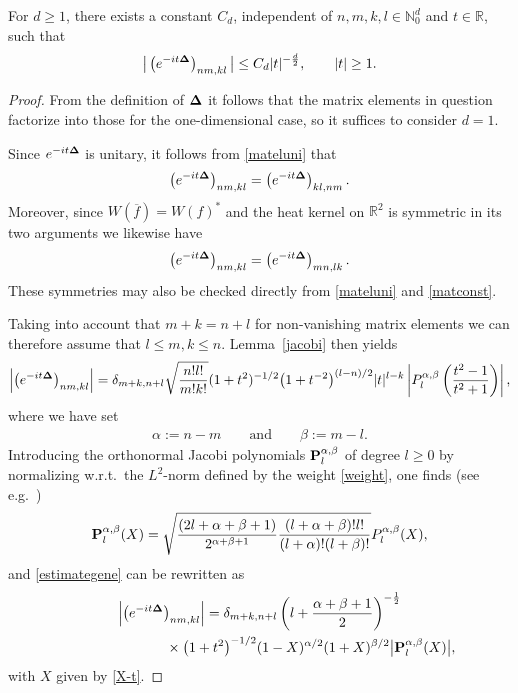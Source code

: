 \documentclass[pdftex]{sigma}
\begin{document}
\begin{lemma}
\label{Uniest1}
For $d\geq 1$, there exists a constant $C_d$, independent of $n,m,k,l
\in\mathbb N_0^d$ and
$t\in\mathbb R$, such that
\begin{gather}\label{decay0}
\big|\left(e^{-it{\bf\Delta}}\right)_{nm,kl}\big| \leq  C_d |t|^{-\frac
d2} ,\qquad |t|\geq 1 .
\end{gather}
\end{lemma}

\begin{proof} From the def\/inition of ${\bf\Delta}$ it follows that the
  matrix elements in question factorize into those for the
  one-dimensional case, so it suf\/f\/ices to consider $d=1$.

 Since $e^{-it{\bf\Delta}}$ is unitary, it follows from
  \eqref{mateluni} that
 \[
\left(e^{-it{\bf\Delta}}\right)_{nm,kl} =  \left(e^{-it{\bf\Delta}}\right)_{kl,nm}.
\]
 Moreover, since
$W(\overline f)=W(f)^*$ and the heat kernel on $\mathbb R^2$ is
symmetric in its two arguments we likewise have
 \[
\left(e^{-it{\bf\Delta}}\right)_{nm,kl} =  \left(e^{-it{\bf\Delta}}\right)_{mn,lk} .
\]
These symmetries may also be checked directly from \eqref{mateluni} and \eqref{matconst}.

Taking into account that $m+k=n+l$ for non-vanishing matrix elements
we can therefore assume that $l\leq m,k\leq n$. Lemma~\ref{jacobi} then yields
\begin{gather}
\label{estimategene}
\left|\left(e^{-it{\bf\Delta}}\right)_{nm,kl}\right|
 = \delta_{m+k,n+l}
\sqrt{\frac{n! l!}{m! k!}}(1+t^2)^{-1/2}
\big(1+t^{-2}\big)^{(l-n)/2}|t|^{l-k}
\left|P_l^{\alpha,\beta}\left(\frac{t^2-1}{t^2+1}\right)\right|,
\end{gather}
where we have set
\begin{gather*}%
\alpha:=n-m \qquad\mbox{and}\qquad \beta:=m-l .
\end{gather*}
Introducing the orthonormal Jacobi polynomials ${\bf
  P}_l^{\alpha,\beta}$ of degree $l\geq 0$ by normalizing w.r.t.\ the
$L^2$-norm def\/ined by the weight \eqref{weight}, one f\/inds (see e.g.~\cite[p.~67]{Szego})
\[
{\bf P}_l^{\alpha,\beta}(X)  =  \sqrt{\frac{(2l+\alpha +\beta +1)}{2^{\alpha
    +\beta +1}}\frac{(l+\alpha +\beta)! l!}{(l+\alpha)! (l+\beta)!}}
P_l^{\alpha,\beta}(X) ,
\]
and \eqref{estimategene} can be rewritten as
\begin{gather}
\left|\left(e^{-it{\bf\Delta}}\right)_{nm,kl}\right|
 = \delta_{m+k,n+l}\left(l+\frac{\alpha +\beta +1}2\right)^{-\frac 12}\nonumber\\
 \hphantom{\left|\left(e^{-it{\bf\Delta}}\right)_{nm,kl}\right|=}{}\times
\big(1+t^2\big)^{-1/2} (1-X)^{\alpha/2}(1+X)^{\beta/2}
\big|{\bf P}_l^{\alpha,\beta}(X)\big| ,\label{estimategene2}
\end{gather}
with $X$ given by \eqref{X-t}.


\end{proof}
\end{document}
